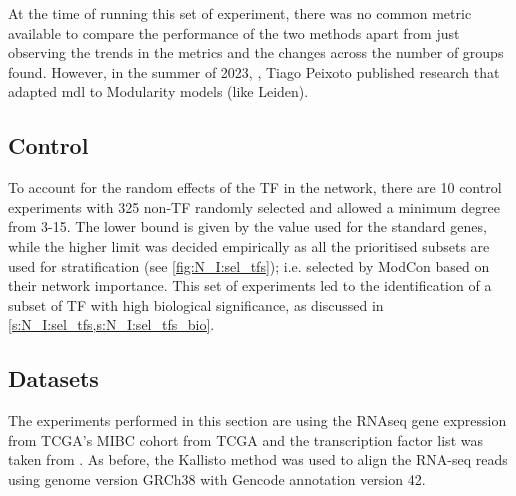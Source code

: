 At the time of running this set of experiment, there was no common metric available to compare the performance of the two methods apart from just observing the trends in the metrics and the changes across the number of groups found. However, in the summer of 2023, \cite{Peixoto2023-mw}, Tiago Peixoto published research that adapted \acrshort{mdl} to Modularity models (like Leiden).

\subsection*{Control}

To account for the random effects of the TF in the network, there are 10 control experiments with 325 non-TF randomly selected and allowed a minimum degree from 3-15. The lower bound is given by the value used for the standard genes, while the higher limit was decided empirically as all the prioritised subsets are used for stratification (see \cref{fig:N_I:sel_tfs}); i.e. selected by ModCon based on their network importance. This set of experiments led to the identification of a subset of TF with high biological significance, as discussed in \cref{s:N_I:sel_tfs,s:N_I:sel_tfs_bio}.



\subsection* {Datasets}

The experiments performed in this section are using the RNAseq gene expression from TCGA's MIBC cohort from TCGA and the transcription factor list was taken from \citet{Lambert2018-el}. As before, the Kallisto method was used to align the RNA-seq reads using genome version GRCh38 with Gencode annotation version 42. 

